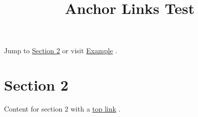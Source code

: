 \documentclass[11pt,a4paper]{article}
\title{Anchor Links Test}
\begin{document}
\maketitle

Jump to \href{\#section-2}{Section 2} or visit \href{https://example.com/}{Example} .

\section{Section 2}

Content for section 2 with a \href{\#}{top link} .
\end{document}
